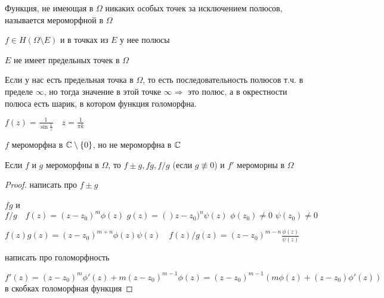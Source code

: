 
\begin{definition}\thmslashn
	
	Функция, не имеющая в $\Omega$ никаких особых точек за исключением полюсов, называется мероморфной в $\Omega$
	
	$f \in H(\Omega \setminus E)$ и в точках из $E$ у нее полюсы
	
\end{definition}


\begin{remark}\thmslashn

	$E$ не имеет предельных точек в $\Omega$
	
	Если у нас есть предельная точка в $\Omega$, то есть последовательность полюсов т.ч. в пределе $\infty$, но тогда значение в этой точке $\infty \Rightarrow$ это полюс, а в окрестности полюса есть шарик, в котором функция голоморфна.
	
\end{remark}

\begin{example}\thmslashn
	
	$f(z) = \frac{1}{\sin \frac{1}{z}} \quad z = \frac{1}{\pi k}$
	
	$f$ мероморфна в $\mathbb{C} \setminus \{0\}$, но не мероморфна в $\mathbb{C}$
	
\end{example}

\begin{property}\thmslashn
	
	Если $f$ и $g$ мероморфны в $\Omega$, то $f \pm g, fg, f/g$ (если $g \not\equiv 0$) и $f'$ мероморны в $\Omega$
		
\end{property}

\begin{proof}\thmslashn
	
	\TODO написать про $f\pm g$
	
	$fg$ и $f/g\quad f(z) = (z - z_0)^m \phi(z)\,\, g(z) = ()z-z_0)^n \psi(z) \,\, \phi(z_0) \not = 0\,\, \psi(z_0) \not = 0$
	
	$f(z)g(z) = (z - z_0)^{m+n}\phi(z)\psi(z) \quad f(z)/g(z) = (z - z_0)^{m-n}\frac{\phi(z)}{\psi(z)}$
	
	\TODO написать про голоморфность
	
	$f'(z) = (z-z_0)^m\phi'(z) + m(z-z_0)^{m-1} \phi(z) = (z - z_0)^{m-1}(m\phi(z) + (z-z_0)\phi'(z))$ в скобках голоморфная функция
	
\end{proof}

